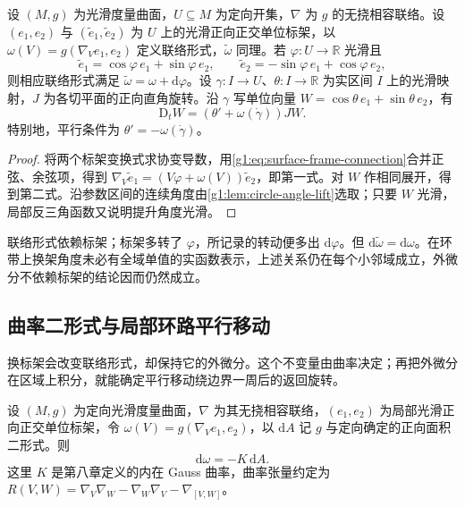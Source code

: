 \begin{proposition}
	\label{g1:prop:connection-frame-change}
	设 \((M,g)\) 为光滑度量曲面，\(U\subseteq M\) 为定向开集，\(\nabla\) 为 \(g\) 的无挠相容联络。设 \((e_1,e_2)\) 与 \((\widetilde e_1,\widetilde e_2)\) 为 \(U\) 上的光滑正向正交单位标架，以 \(\omega(V)=g(\nabla_Ve_1,e_2)\) 定义联络形式，\(\widetilde\omega\) 同理。若 \(\varphi:U\to\mathbb R\) 光滑且
	\[
		\widetilde e_1=\cos\varphi\,e_1+\sin\varphi\,e_2,\qquad
		\widetilde e_2=-\sin\varphi\,e_1+\cos\varphi\,e_2,
	\]
	则相应联络形式满足 \(\widetilde\omega=\omega+\mathrm{d}\varphi\)。设 \(\gamma:I\to U\)、\(\theta:I\to\mathbb R\) 为实区间 \(I\) 上的光滑映射，\(J\) 为各切平面的正向直角旋转。沿 \(\gamma\) 写单位向量 \(W=\cos\theta\,e_1+\sin\theta\,e_2\)，有
	\begin{equation}
		\label{g1:eq:parallel-angle}
		\mathrm{D}_tW=(\theta'+\omega(\dot\gamma))JW.
	\end{equation}
	特别地，平行条件为 \(\theta'=-\omega(\dot\gamma)\)。
\end{proposition}

\begin{proof}
	将两个标架变换式求协变导数，用\eqref{g1:eq:surface-frame-connection}合并正弦、余弦项，得到 \(\nabla_V\widetilde e_1=(V\varphi+\omega(V))\widetilde e_2\)，即第一式。对 \(W\) 作相同展开，得到第二式。沿参数区间的连续角度由\cref{g1:lem:circle-angle-lift}选取；只要 \(W\) 光滑，局部反三角函数又说明提升角度光滑。
\end{proof}

联络形式依赖标架；标架多转了 \(\varphi\)，所记录的转动便多出 \(\mathrm{d}\varphi\)。但 \(\mathrm{d}\widetilde\omega=\mathrm{d}\omega\)。在环带上换架角度未必有全域单值的实函数表示，上述关系仍在每个小邻域成立，外微分不依赖标架的结论因而仍然成立。

\subsection{曲率二形式与局部环路平行移动}
\label{g1:subsec:0901:04}

换标架会改变联络形式，却保持它的外微分。这个不变量由曲率决定；再把外微分在区域上积分，就能确定平行移动绕边界一周后的返回旋转。

\begin{proposition}
	\label{g1:prop:connection-curvature-form}
	设 \((M,g)\) 为定向光滑度量曲面，\(\nabla\) 为其无挠相容联络，\((e_1,e_2)\) 为局部光滑正向正交单位标架，令 \(\omega(V)=g(\nabla_Ve_1,e_2)\)，以 \(\mathrm dA\) 记 \(g\) 与定向确定的正向面积二形式。则
	\begin{equation}
		\label{g1:eq:surface-curvature-form}
		\mathrm{d}\omega=-K\,\mathrm{d}A.
	\end{equation}
	这里 \(K\) 是第八章定义的内在 Gauss 曲率，曲率张量约定为 \(R(V,W)=\nabla_V\nabla_W-\nabla_W\nabla_V-\nabla_{[V,W]}\)。
\end{proposition}


